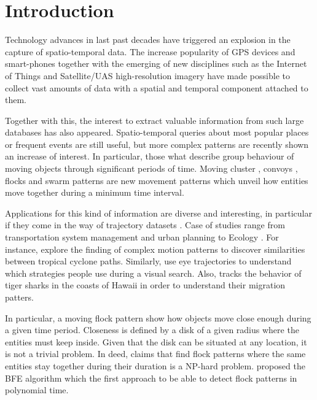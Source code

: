 \documentclass[journal,onecolumn]{IEEEtran}
\begin{document}
% 

\section{Introduction}
Technology advances in last past decades have triggered an explosion in the capture of spatio-temporal data.  The increase popularity of GPS devices and smart-phones together with the emerging of new disciplines such as the Internet of Things and Satellite/UAS high-resolution imagery have made possible to collect vast amounts of data with a spatial and temporal component attached to them.

Together with this, the interest to extract valuable information from such large databases has also appeared.  Spatio-temporal queries about most popular places or frequent events are still useful, but more complex patterns are recently shown an increase of interest.  In particular, those what describe group behaviour of moving objects through significant periods of time.  Moving cluster \cite{kalnis_discovering_2005}, convoys \cite{jeung_discovery_2008}, flocks \cite{gudmundsson_computing_2006} and swarm patterns \cite{li_swarm:_2010} are new movement patterns which unveil how entities move together during a minimum time interval. 

Applications for this kind of information are diverse and interesting, in particular if they come in the way of trajectory datasets \cite{jeung_trajectory_2011, huang_mining_2015}. Case of studies range from transportation system management and urban planning \cite{di_lorenzo_allaboard:_2016} to Ecology \cite{la_sorte_convergence_2016}.  For instance, \cite{turdukulov_visual_2014} explore the finding of complex motion patterns to discover similarities between tropical cyclone paths.  Similarly, \cite{amor_persistence_2016} use eye trajectories to understand which strategies people use during a visual search. Also, \cite{holland_movements_1999} tracks the behavior of tiger sharks in the coasts of Hawaii in order to understand their migration patters.

In particular, a moving flock pattern show how objects move close enough during a given time period.  Closeness is defined by a disk of a given radius where the entities must keep inside.  Given that the disk can be situated at any location, it is not a trivial problem.  In deed, \cite{gudmundsson_computing_2006} claims that find flock patterns where the same entities stay together during their duration is a NP-hard problem. \cite{vieira_2009} proposed the BFE algorithm which the first approach to be able to detect flock patterns in polynomial time.
\end{document}
